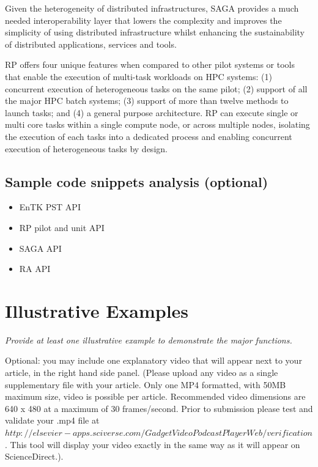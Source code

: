 \documentclass[preprint,12pt, a4paper]{elsarticle}
\begin{document}
Given the heterogeneity of distributed infrastructures, SAGA provides a much
needed interoperability layer that lowers the complexity and improves the
simplicity of using distributed infrastructure whilst enhancing the
sustainability of distributed applications, services and tools.

RP offers four unique features when compared to other pilot systems or tools
that enable the execution of multi-task workloads on HPC systems: (1)
concurrent execution of heterogeneous tasks on the same pilot; (2) support of
all the major HPC batch systems; (3) support of more than twelve methods to
launch tasks; and (4) a general purpose architecture. RP can execute single
or multi core tasks within a single compute node, or across multiple nodes, 
isolating the execution of each tasks into a dedicated process and enabling
concurrent execution of heterogeneous tasks by design.



\subsection{Sample code snippets analysis (optional)}\label{sec:code}

\begin{itemize}
  \item EnTK PST API
  \item RP pilot and unit API
  \item SAGA API
  \item RA API
\end{itemize}

\section{Illustrative Examples}\label{sec:examples}

{\em Provide at least one illustrative example to demonstrate the major
functions.

Optional: you may include one explanatory video that will appear next to your
article, in the right hand side panel. (Please upload any video as a single
supplementary file with your article. Only one MP4 formatted, with 50MB
maximum size, video is possible per article. Recommended video dimensions are
640 x 480 at a maximum of 30 frames/second. Prior to submission please test
and validate your .mp4 file at $
http://elsevier-apps.sciverse.com/GadgetVideoPodcastPlayerWeb/verification$.
This tool will display your video exactly in the same way as it will appear
on ScienceDirect.).}
\end{document}
